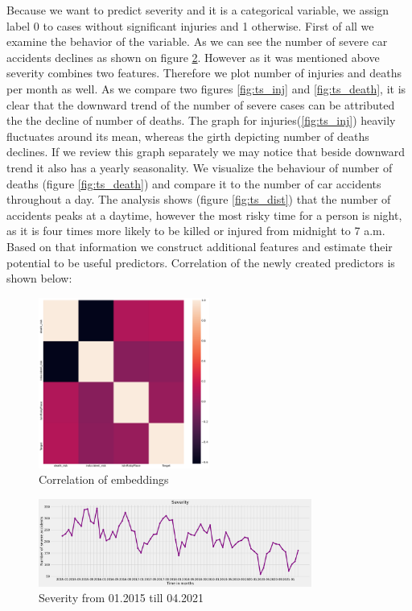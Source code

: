 Because we want to predict severity and it is a categorical variable, we assign label 0 to cases without significant injuries and 1 otherwise.
First of all we examine the behavior of the variable. As we can see the number of severe car accidents declines as shown on figure \ref{fig:ts_sev}.
However as it was mentioned above severity combines two features.
Therefore we plot number of injuries and deaths per month as well.
As we compare two figures \ref{fig:ts_inj} and \ref{fig:ts_death}, it is clear that the downward trend of the number of severe cases can be attributed the the decline of number of deaths.
The graph for injuries(\ref{fig:ts_inj}) heavily fluctuates around its mean, whereas the girth depicting number of deaths declines. 
If we review this graph separately we may notice that beside downward trend it also has a yearly seasonality.
We visualize the behaviour of number of deaths (figure \ref{fig:ts_death}) and compare it to the number of car accidents throughout a day.
The analysis shows (figure \ref{fig:ts_dist}) that the number of accidents peaks at a daytime, however the most risky time for a person is night,
as it is four times more likely to be killed or injured from midnight to 7 a.m. 
Based on that information we construct additional features and estimate their potential to be useful predictors.
Correlation of the newly created predictors is shown below:
\begin{figure}[htpb]
	\centering
	\includegraphics[width=0.5\textwidth]{../imgs/pdf_files/new_embeddings_correlation.pdf}
	\caption{Correlation of embeddings}
	\label{fig:new_embed}
\end{figure}

\begin{figure}[htpb]
	\centering
	\includegraphics[width=0.8\textwidth]{../imgs/pdf_files/ts_severity.pdf}
	\caption{Severity from 01.2015 till 04.2021}
	\label{fig:ts_sev}
\end{figure}

